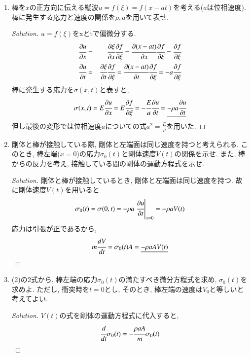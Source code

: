 \documentclass[12pt]{jsarticle}
\newenvironment{solution}
  {\renewcommand\qedsymbol{$\blacksquare$}\begin{proof}[Solution]}
  {\end{proof}}
\begin{document}
\begin{enumerate}
\item 棒を$x$の正方向に伝える縦波$u=f(\xi )=f(x-at)$を考える($a$は位相速度). 棒に発生する応力と速度の関係を$\rho, a$を用いて表せ.
\begin{solution}
$u=f(\xi)$をxとtで偏微分する.
\begin{eqnarray*}
\cfrac{\partial u}{\partial x} &=& \cfrac{\partial \xi}{\partial x}\cfrac{\partial f}{\partial \xi} = \cfrac{\partial(x-at)}{\partial x}\cfrac{\partial f}{\partial \xi} = \cfrac{\partial f}{\partial \xi} \\
\cfrac{\partial u}{\partial t} &=& \cfrac{\partial \xi}{\partial t}\cfrac{\partial f}{\partial \xi} = \cfrac{\partial(x-at)}{\partial t}\cfrac{\partial f}{\partial \xi} = -a\cfrac{\partial f}{\partial \xi}
\end{eqnarray*}
棒に発生する応力を$\sigma(x, t)$と表すと,
\begin{eqnarray*}
\sigma(x,t) = E\cfrac{\partial u}{\partial x} = E\cfrac{\partial f}{\partial \xi} = -\cfrac{E}{a}\cfrac{\partial u}{\partial t} = \underline{-\rho a\cfrac{\partial u}{\partial t}}
\end{eqnarray*}
但し最後の変形では位相速度$a$についての式$a^2=\frac{E}{\rho}$を用いた.
\end{solution}
\item 剛体と棒が接触している際, 剛体と左端面は同じ速度を持つと考えられる. このとき, 棒左端($x=0$)の応力$\sigma_0(t)$と剛体速度$V(t)$の関係を示せ. また, 棒からの反力を考え, 接触している間の剛体の運動方程式を示せ.
\begin{solution}
剛体と棒が接触しているとき, 剛体と左端面は同じ速度を持つ. 故に剛体速度$V(t)$を用いると
\begin{eqnarray*}
\sigma_0(t) = \sigma(0,t) = -\rho a \left.\cfrac{\partial u}{\partial t}\right |_{x=0} = -\rho a V(t)
\end{eqnarray*}
応力は引張が正であるから,
\begin{eqnarray*}
m\cfrac{dV}{dt} = \sigma_0(t)A = \underline{-\rho aAV(t)}
\end{eqnarray*}
\end{solution}
\item (2)の2式から, 棒左端の応力$\sigma_0(t)$の満たすべき微分方程式を求め, $\sigma_0(t)$を求めよ. ただし, 衝突時を$t=0$とし, そのとき, 棒左端の速度は$V_0$と等しいと考えてよい.
\begin{solution}
$V(t)$の式を剛体の運動方程式に代入すると,
\begin{eqnarray*}
\cfrac{d}{dt}\sigma_0(t) = -\cfrac{\rho aA}{m}\sigma_0(t)

\end{eqnarray*}
\end{solution}
\end{enumerate}
\end{document}
